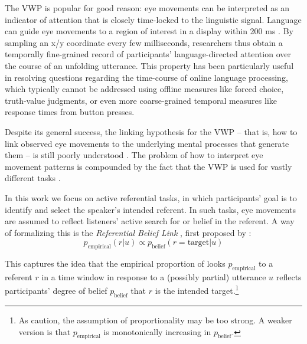 \documentclass[10pt,letterpaper]{article}
\begin{document}
The VWP is popular for good reason: eye movements can be interpreted as an indicator of attention that is closely time-locked to the linguistic signal. Language can guide eye movements to a region of interest in a display within 200 ms \cite{Allopenna1998}. By sampling an x/y coordinate every few milliseconds, researchers thus obtain a temporally fine-grained record of participants' language-directed attention over the course of an unfolding utterance. This property has been particularly useful in resolving questions regarding the time-course of online language processing, which typically cannot be addressed using offline measures like forced choice, truth-value judgments, or even more coarse-grained temporal measures like response times from button presses. 



Despite its general success, the linking hypothesis for the VWP -- that is, how to link observed eye movements to the underlying mental processes that generate them -- is still poorly understood \cite{SalverdaTanenhaus2017:The-Visual-World-Paradigm, tanenhaus2000eye, Allopenna1998, magnuson2019fixations}. The problem of how to interpret eye movement patterns  is compounded by the fact that the VWP is used for vastly different tasks \cite<for an overview, see>{Huettig2011}. 

In this work we focus on active referential tasks, in which participants' goal is to identify and select the speaker's intended referent. In such tasks, eye movements are assumed to reflect listeners' active search for or belief in the referent. A way of formalizing this is the \emph{Referential Belief Link} \cite{DegenEtAl2021}, first proposed by :
\begin{equation}
p_{\textrm{empirical}}(r|u) \propto p_{\textrm{belief}}(r = \textrm{target}|u)
\end{equation}

This captures the idea that the empirical proportion of looks $p_{\textrm{empirical}}$ to a referent $r$ in a time window in response to a (possibly partial) utterance $u$ reflects participants' degree of belief $p_{\textrm{belief}}$ that $r$ is the intended target.\footnote{As  caution, the assumption of proportionality may be too strong. A weaker version is that $p_{\textrm{empirical}}$ is monotonically increasing in $p_{\textrm{belief}}$.}
\end{document}
